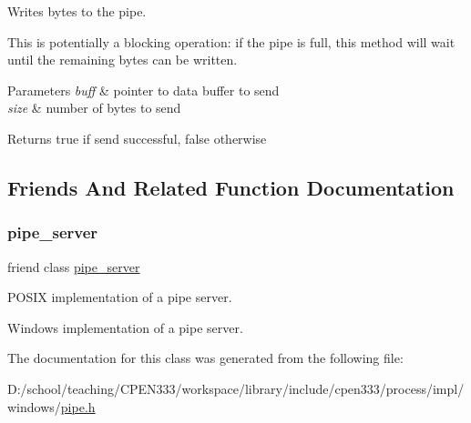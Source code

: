 Writes bytes to the pipe. 

This is potentially a blocking operation\+: if the pipe is full, this method will wait until the remaining bytes can be written.


\begin{DoxyParams}{Parameters}
{\em buff} & pointer to data buffer to send \\
\hline
{\em size} & number of bytes to send \\
\hline
\end{DoxyParams}
\begin{DoxyReturn}{Returns}
true if send successful, false otherwise 
\end{DoxyReturn}


\subsection{Friends And Related Function Documentation}
\mbox{\label{classcpen333_1_1process_1_1windows_1_1pipe_ab111e84ef31179e72c2bd2e58e2042b0}} 
\subsubsection{\texorpdfstring{pipe\+\_\+server}{pipe\_server}}
{\footnotesize\ttfamily friend class \hyperlink{classcpen333_1_1process_1_1windows_1_1pipe__server}{pipe\+\_\+server}\hspace{0.3cm}{\ttfamily [friend]}}



P\+O\+S\+IX implementation of a pipe server. 

Windows implementation of a pipe server. 

The documentation for this class was generated from the following file\+:\begin{DoxyCompactItemize}
\item 
D\+:/school/teaching/\+C\+P\+E\+N333/workspace/library/include/cpen333/process/impl/windows/\hyperlink{impl_2windows_2pipe_8h}{pipe.\+h}\end{DoxyCompactItemize}
